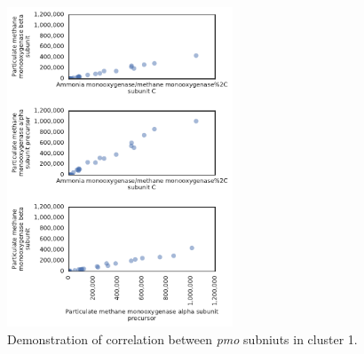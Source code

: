 \begin{figure}[H]
\centering
    \includegraphics[width=0.6\textwidth]{./tex/chapter3/figures/170402_correlations_between_pMMO_subunits--set1.pdf}
    \begin{singlespace}
    \caption[Demonstration of correlation between \textit{pmo} subniuts in cluster 1]{
        Demonstration of correlation between \textit{pmo} subniuts in cluster 1.}
    \label{fig:pmo_cor1}
    \end{singlespace}
\end{figure}

